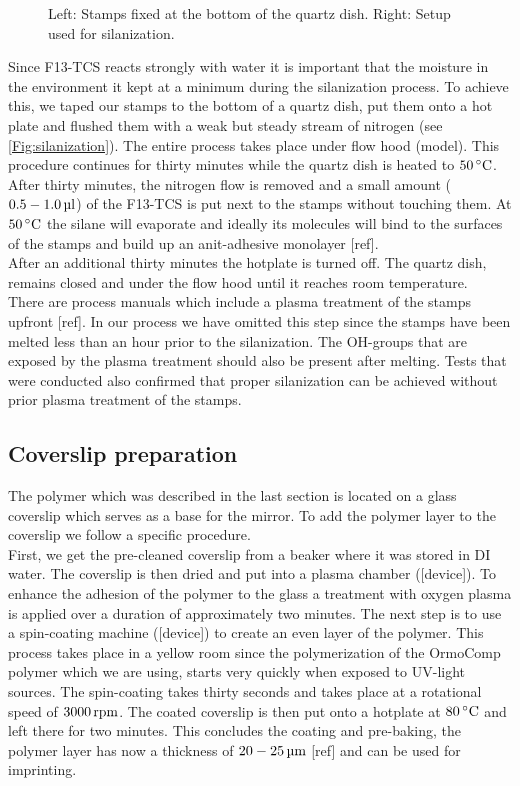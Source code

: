 \begin{figure}[H]
	\caption{Left: Stamps fixed at the bottom of the quartz dish. Right: Setup used for silanization.}
	\label{Fig:silanization}
\end{figure}
Since F13-TCS reacts strongly with water it is important that the moisture in the environment it kept at a minimum during the silanization process. To achieve this, we taped our stamps to the bottom of a quartz dish, put them onto a hot plate and flushed them with a weak but steady stream of nitrogen (see \autoref{Fig:silanization}). The entire process takes place under flow hood (model). This procedure continues for thirty minutes while the quartz dish is heated to $50\degrees$.\\
After thirty minutes, the nitrogen flow is removed and a small amount ($0.5-1.0\ul$) of the F13-TCS is put next to the stamps without touching them. At $50\degrees$ the silane will evaporate and ideally its molecules will bind to the surfaces of the stamps and build up an anit-adhesive monolayer [ref].\\
After an additional thirty minutes the hotplate is turned off. The quartz dish, remains closed and under the flow hood until it reaches room temperature.\\
There are process manuals which include a plasma treatment of the stamps upfront [ref]. In our process we have omitted this step since the stamps have been melted less than an hour prior to the silanization. The OH-groups that are exposed by the plasma treatment should also be present after melting. Tests that were conducted also confirmed that proper silanization can be achieved without prior plasma treatment of the stamps.

\subsection{Coverslip preparation}\label{ChapCoverslipPreparation}
The polymer which was described in the last section is located on a glass coverslip which serves as a base for the mirror. To add the polymer layer to the coverslip we follow a specific procedure.\\
First, we get the pre-cleaned coverslip from a beaker where it was stored in DI water. The coverslip is then dried and put into a plasma chamber ([device]). To enhance the adhesion of the polymer to the glass a treatment with oxygen plasma is applied over a duration of approximately two minutes. The next step is to use a spin-coating machine ([device]) to create an even layer of the polymer. This process takes place in a yellow room since the polymerization of the OrmoComp polymer which we are using, starts very quickly when exposed to UV-light sources. The spin-coating takes thirty seconds and takes place at a rotational speed of $3000\rpm$. The coated coverslip is then put onto a hotplate at $80\degrees$ and left there for two minutes. This concludes the coating and pre-baking, the polymer layer has now a thickness of $20-25\um$ [ref] and can be used for imprinting.

